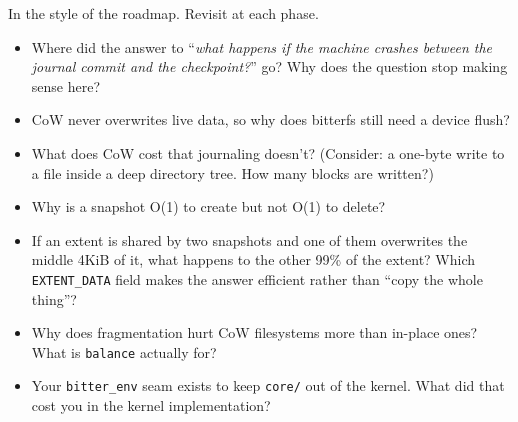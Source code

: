 In the style of the roadmap. Revisit at each phase.

\begin{itemize}
\tightlist
\item
  Where did the answer to ``\emph{what happens if the machine crashes between the journal commit
  and the checkpoint?}'' go? Why does the question stop making sense here?
\item
  CoW never overwrites live data, so why does bitterfs still need a device flush?
\item
  What does CoW cost that journaling doesn't? (Consider: a one-byte write to a file inside
  a deep directory tree. How many blocks are written?)
\item
  Why is a snapshot O(1) to create but not O(1) to delete?
\item
  If an extent is shared by two snapshots and one of them overwrites the middle 4KiB of it,
  what happens to the other 99\% of the extent? Which \texttt{EXTENT\_DATA} field makes the answer
  efficient rather than ``copy the whole thing''?
\item
  Why does fragmentation hurt CoW filesystems more than in-place ones? What is \texttt{balance}
  actually for?
\item
  Your \texttt{bitter\_env} seam exists to keep \texttt{core/} out of the kernel. What did that cost you
  in the kernel implementation?
\end{itemize}
